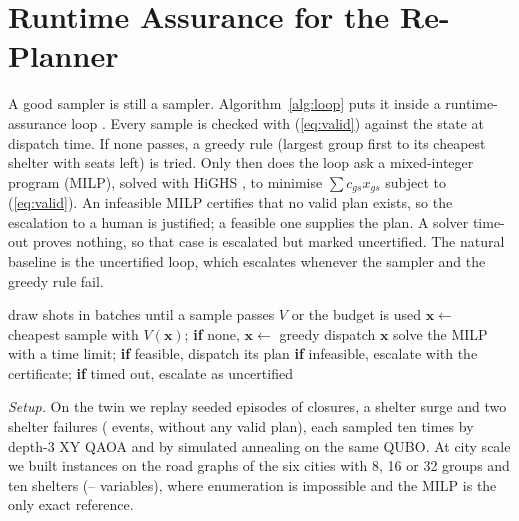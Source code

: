 \documentclass[conference]{IEEEtran}
\begin{document}
\section{Runtime Assurance for the Re-Planner}\label{sec:ra}
A good sampler is still a sampler. Algorithm~\ref{alg:loop} puts it inside a runtime-assurance loop \cite{Sha2001,Desai2019}. Every sample is checked with (\ref{eq:valid}) against the state at dispatch time. If none passes, a greedy rule (largest group first to its cheapest shelter with seats left) is tried. Only then does the loop ask a mixed-integer program (MILP), solved with HiGHS \cite{Huangfu2018}, to minimise $\sum c_{gs}x_{gs}$ subject to (\ref{eq:valid}). An infeasible MILP certifies that no valid plan exists, so the escalation to a human is justified; a feasible one supplies the plan. A solver time-out proves nothing, so that case is escalated but marked uncertified. The natural baseline is the uncertified loop, which escalates whenever the sampler and the greedy rule fail.

\begin{algorithm}[t]
\caption{Runtime-assurance re-planning at one event}
\label{alg:loop}
\begin{algorithmic}[1]
\small
\STATE draw shots in batches until a sample passes $V$ or the budget is used
\STATE $\mathbf x\leftarrow$ cheapest sample with $V(\mathbf x)$; \textbf{if} none, $\mathbf x\leftarrow$ greedy
\STATE dispatch $\mathbf x$
\ELSE
\STATE solve the MILP with a time limit; \textbf{if} feasible, dispatch its plan
\STATE \textbf{if} infeasible, escalate with the certificate; \textbf{if} timed out, escalate as uncertified
\ENDIF
\end{algorithmic}
\end{algorithm}

\textit{Setup.} On the twin we replay \RaTwinSeeds{} seeded episodes of closures, a shelter surge and two shelter failures (\RaTwinEvents{} events, \RaTwinInfeasible{} without any valid plan), each sampled ten times by depth-3 XY QAOA and by simulated annealing \cite{Kirkpatrick1983} on the same QUBO. At city scale we built \RaCityN{} instances on the road graphs of the six cities with 8, 16 or 32 groups and ten shelters (\RaCityMinVars--\RaCityMaxVars{} variables), where enumeration is impossible and the MILP is the only exact reference.
\end{document}
